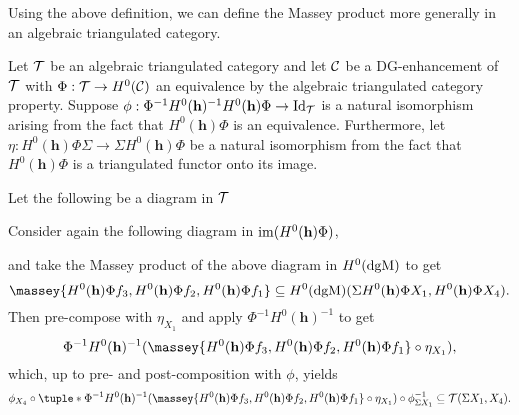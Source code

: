 Using the above definition, we can define the Massey product more generally in an algebraic triangulated category.

\begin{definition}
    \label{def:massey_product_alg_tri_cat}
    Let \( {\mathcal{T}} \) be an algebraic triangulated category and let \( {\mathcal{C}} \) be a DG-enhancement of \( {\mathcal{T}} \) with \( \Phi: {\mathcal{T}} \to H^0({\mathcal{C}}) \) an equivalence by the algebraic triangulated category property. Suppose \( \phi: \Phi^{-1} H^0(\mathbf{h})^{-1} H^0(\mathbf{h}) \Phi \to \operatorname{Id}_{{\mathcal{T}}} \) is a natural isomorphism arising from the fact that \( H^0(\mathbf{h}) \Phi \) is an equivalence. Furthermore, let \( \eta: H^0(\mathbf{h}) \Phi \Sigma \to \Sigma H^0(\mathbf{h}) \Phi \) be a natural isomorphism from the fact that \( H^0(\mathbf{h}) \Phi \) is a triangulated functor onto its image.
    
    Let the following be a diagram in \( {\mathcal{T}} \)
    \begin{center}
    \end{center}
    Consider again the following diagram in \( \operatorname{im}(H^0(\mathbf{h}) \Phi) \),
    \begin{center}
    \end{center}
    and take the Massey product of the above diagram in \( H^0(\operatorname{dgM}) \) to get
    \[
        \massey{H^0(\mathbf{h}) \Phi f_3, H^0(\mathbf{h}) \Phi f_2, H^0(\mathbf{h}) \Phi f_1} \subseteq H^0(\dgM)(\Sigma H^0(\mathbf{h}) \Phi X_1, H^0(\mathbf{h}) \Phi X_4).
    \]
    Then pre-compose with \( \eta_{X_1} \) and apply \( \Phi^{-1} H^0(\mathbf{h})^{-1} \) to get
    \[
        \Phi^{-1} H^0(\mathbf{h})^{-1} (\massey{H^0(\mathbf{h}) \Phi f_3, H^0(\mathbf{h}) \Phi f_2, H^0(\mathbf{h}) \Phi f_1} \circ \eta_{X_1}),
    \]
    which, up to pre- and post-composition with \( \phi \), yields
    \[
        \phi_{X_4} \circ \tuple*{\Phi^{-1} H^0(\mathbf{h})^{-1} (\massey{H^0(\mathbf{h}) \Phi f_3, H^0(\mathbf{h}) \Phi f_2, H^0(\mathbf{h}) \Phi f_1} \circ \eta_{X_1})} \circ \phi^{-1}_{\Sigma X_1} \subseteq \Tc(\Sigma X_1, X_4).
    \]


\end{definition}
